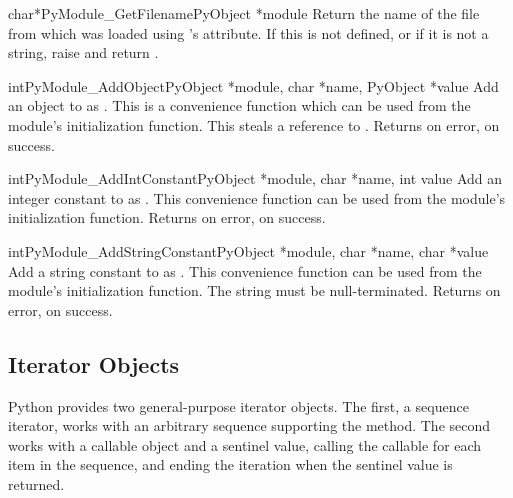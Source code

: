 \begin{cfuncdesc}{char*}{PyModule_GetFilename}{PyObject *module}
  Return the name of the file from which  was loaded using
  's  attribute.  If this is not defined,
  or if it is not a string, raise  and return
  \NULL.
\end{cfuncdesc}

\begin{cfuncdesc}{int}{PyModule_AddObject}{PyObject *module,
                                           char *name, PyObject *value}
  Add an object to  as .  This is a convenience
  function which can be used from the module's initialization
  function.  This steals a reference to .  Returns
   on error,  on success.
\end{cfuncdesc}

\begin{cfuncdesc}{int}{PyModule_AddIntConstant}{PyObject *module,
                                                char *name, int value}
  Add an integer constant to  as .  This
  convenience function can be used from the module's initialization
  function. Returns  on error,  on success.
\end{cfuncdesc}

\begin{cfuncdesc}{int}{PyModule_AddStringConstant}{PyObject *module,
                                                   char *name, char *value}
  Add a string constant to  as .  This
  convenience function can be used from the module's initialization
  function.  The string  must be null-terminated.  Returns
   on error,  on success.
\end{cfuncdesc}


\subsection{Iterator Objects \label{iterator-objects}}

Python provides two general-purpose iterator objects.  The first, a
sequence iterator, works with an arbitrary sequence supporting the
 method.  The second works with a callable
object and a sentinel value, calling the callable for each item in the
sequence, and ending the iteration when the sentinel value is
returned.

